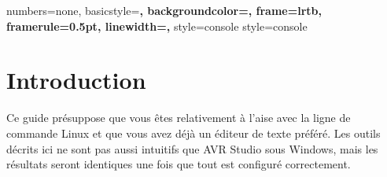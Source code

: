 \newpage{}

\fancyfoot{}
\lhead{}
\cfoot{\thepage}        %
\rfoot{\today} %


\newcommand{\expr}[1]{\og \emph{{#1}} \fg} %
\newcommand{\important}[1]{\textbf{#1}}
\newcommand{\code}[1]{\texttt{#1}}

\newcommand{\urlrobopoly}{\url{http://robopoly.epfl.ch}}
\newcommand{\urldownloads}{\url{http://github.com/tunebird/robopoly-linux/downloads}}
\newcommand{\urlreadme}{
\url{http://github.com/tunebird/robopoly-linux/blob/master/example/README.md}}
\newcommand{\urlgithub}{\url{http://github.com/tunebird/robopoly-linux}}




\tableofcontents{}

\newpage

\lstset{language=C}
{
  numbers=none,
  basicstyle=\bf\ttfamily,
  backgroundcolor=\color{grey92},
  frame=lrtb,
  framerule=0.5pt,
  linewidth=\textwidth,
}
{
  style=console
}
{
  style=console
}

\lstset{
  style=console
}



\section*{Introduction}
Ce guide présuppose que vous êtes relativement à l'aise avec la ligne de
commande Linux et que vous avez déjà un éditeur de texte préféré. Les outils
décrits ici ne sont pas aussi intuitifs que AVR Studio sous Windows, mais les
résultats seront identiques une fois que tout est configuré correctement.


